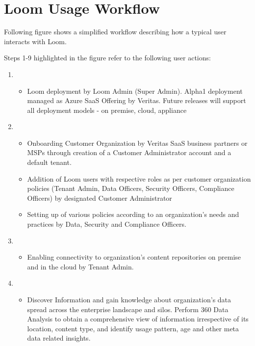 \documentclass[letterpaper,10pt,english]{sphinxmanual}
\begin{document}
\section{Loom Usage Workflow}
\label{\detokenize{loom_getting_started_guide:loom-usage-workflow}}
Following figure shows a simplified workflow describing how a typical user interacts with Loom.

Steps 1-9 highlighted in the figure refer to the following user actions:
\begin{enumerate}
\item {} 
\begin{itemize}
\item {} 
Loom deployment by Loom Admin (Super Admin). Alpha1 deployment managed as Azure SaaS Offering by Veritas. Future releases will support all deployment models - on premise, cloud, appliance

\end{itemize}

\item {} 
\begin{itemize}
\item {} 
Onboarding Customer Organization by Veritas SaaS business partners or MSPs through creation of a Customer Administrator account and a default tenant.

\item {} 
Addition of Loom users with respective roles as per customer organization policies (Tenant Admin, Data Officers, Security Officers, Compliance Officers) by designated Customer Administrator

\item {} 
Setting up of various policies according to an organization’s needs and practices by Data, Security and Compliance Officers.

\end{itemize}

\item {} 
\begin{itemize}
\item {} 
Enabling connectivity to organization’s content repositories on premise and in the cloud by Tenant Admin.

\end{itemize}

\item {} 
\begin{itemize}
\item {} 
Discover Information and gain knowledge about organization’s data spread across the enterprise landscape and silos. Perform 360 Data Analysis to obtain a comprehensive view of information irrespective of its location, content type, and identify usage pattern, age and other meta data related insights.


\end{itemize}
\end{enumerate}
\end{document}
